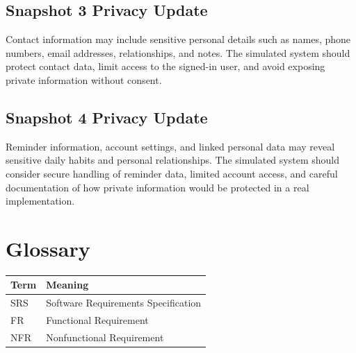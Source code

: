\documentclass{article}
\begin{document}
\subsection{Snapshot 3 Privacy Update}

Contact information may include sensitive personal details such as names, phone numbers, email addresses, relationships, and notes. The simulated system should protect contact data, limit access to the signed-in user, and avoid exposing private information without consent.

\subsection{Snapshot 4 Privacy Update}

Reminder information, account settings, and linked personal data may reveal sensitive daily habits and personal relationships. The simulated system should consider secure handling of reminder data, limited account access, and careful documentation of how private information would be protected in a real implementation.

\section{Glossary}
\begin{longtable}{|p{3cm}|p{10cm}|}
\hline
Term & Meaning \\ \hline
SRS & Software Requirements Specification \\ \hline
FR & Functional Requirement \\ \hline
NFR & Nonfunctional Requirement \\ \hline
\end{longtable}
\end{document}
